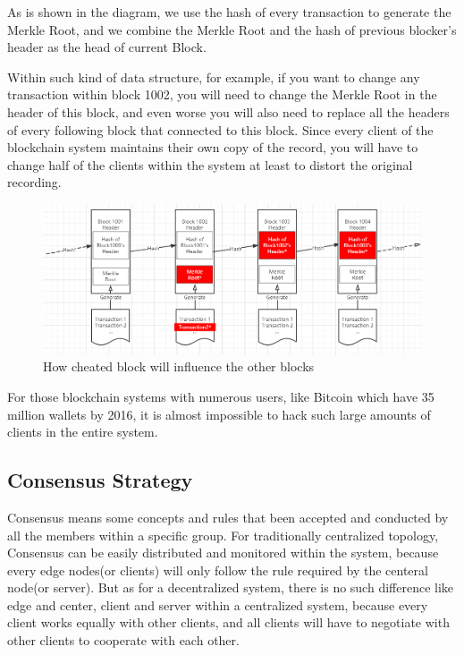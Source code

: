 \documentclass[runningheads]{llncs}
\begin{document}
As is shown in the diagram, we use the hash of every transaction to generate the Merkle Root, and we combine the Merkle Root and the hash of previous blocker’s header as the head of current Block.

Within such kind of data structure, for example, if you want to change any transaction within block 1002, you will need to change the Merkle Root in the header of this block, and even worse you will also need to replace all the headers of every following block that connected to this block. Since every client of the blockchain system maintains their own copy of the record, you will have to change half of the clients within the system at least to distort the original recording.

\begin{figure}[H]
	\centering
	\includegraphics[width=12cm]{reportpics/3.png}
	\caption{How cheated block will influence the other blocks}
	\label{how cheated block will influence the other blocks}
\end{figure}

For those blockchain systems with numerous users, like Bitcoin which have 35 million wallets by 2016\cite{hileman2017global}, it is almost impossible to hack such large amounts of clients in the entire system.

\subsection{Consensus Strategy}

Consensus means some concepts and rules that been accepted and conducted by all the members within a specific group. For traditionally centralized topology, Consensus can be easily distributed and monitored within the system, because every edge nodes(or clients) will only follow the rule required by the centeral node(or server). But as for a decentralized system, there is no such difference like edge and center, client and server within a centralized system, because every client works equally with other clients, and all clients will have to negotiate with other clients to cooperate with each other.
\end{document}
